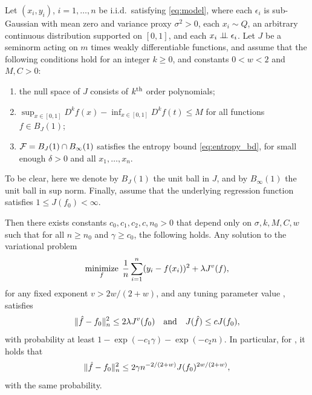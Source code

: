 \documentclass{article}
\begin{document}
\begin{theorem}
\label{thm:main}
Let $(x_i,y_i)$, $i=1,\dots,n$ be i.i.d.\ satisfying \eqref{eq:model}, where
each $\epsilon_i$ is sub-Gaussian with mean zero and variance proxy
$\sigma^2>0$, each $x_i \sim Q$, an arbitrary continuous distribution supported
on $[0,1]$, and each $x_i \perp\!\!\!\perp \epsilon_i$. Let $J$ be a seminorm acting on
$m$ times weakly differentiable functions, and assume that the following
conditions hold for an integer $k \geq 0$, and constants $0<w<2$ and $M,C>0$: 
\begin{enumerate}[label=A\arabic*.]
\item the null space of $J$ consists of $k^{\text{th}}$ order polynomials;
\item $\sup_{x \in [0,1]} D^k f (x) - \inf_{x \in [0,1]} D^k f(t) \leq M$ for
  all functions $f \in B_J(1)$;
\item $\mathcal{F} = B_J(1) \cap B_\infty(1)$ satisfies the entropy bound
  \eqref{eq:entropy_bd}, for small enough $\delta>0$ and all $x_1,\dots,x_n$.     
\end{enumerate}
To be clear, here we denote by $B_J(1)$ the unit ball in $J$, and by
$B_\infty(1)$ the unit ball in sup norm. Finally, assume that the underlying
regression function satisfies $1 \leq J(f_0) < \infty$.  

Then there exists constants $c_0,c_1,c_2,c,n_0>0$ that depend only on   
$\sigma,k,M,C,w$ such that for all $n \geq n_0$ and $\gamma \geq c_0$, the 
following holds. Any solution \smash{$\hf$} to the variational problem 
\begin{equation}
\label{eq:variational_opt_v}
\mathop{\mathrm{minimize}}_f \; \frac{1}{n} \sum_{i=1}^n (y_i - f(x_i))^2 + \lambda J^v(f), 
\end{equation}
for any fixed exponent $v > 2w/(2+w)$, and any tuning parameter value 
,
satisfies     
\begin{equation}
\label{eq:error_bd1}
\|\hat{f} - f_0\|_n^2 \leq 2 \lambda J^v(f_0) \quad \text{and} \quad J(\hat{f}) \leq c
J(f_0), 
\end{equation}
with probability at least $1 - \exp(-c_1\gamma) - \exp(-c_2n)$. In particular,  
for , it holds that 
\begin{equation}
\label{eq:error_bd2}
\|\hat{f} - f_0\|_n^2 \leq 2 \gamma n^{-2/(2+w)} J(f_0)^{2w/(2+w)},
\end{equation}
with the same probability.
\end{theorem}
\end{document}
